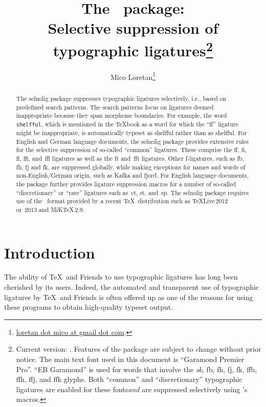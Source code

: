 \documentclass[11pt]{article}
\title{The \selnoligpackagename\ package: \\
Selective suppression of typographic ligatures\thanks{
Current version: \selnoligpackageversion. Features of the \pkg{selnolig} package are subject to change without prior notice. 
\newline\hspace*{\parindent}
The main text font used in this document is \enquote{Garamond Premier Pro}. \enquote{\ebg EB Garamond} is used for words that involve the \emph{\mbox{\ebg sk}}, {\ebg \mbox{fb}, \mbox{fh}, \mbox{fj}, \mbox{fk}, \mbox{ffb}, \mbox{ffh}, \mbox{ffj}, and \mbox{ffk}} glyphs. Both \enquote{common} and \enquote{discretionary} typographic ligatures are enabled for these fonts\textemdash \emph{and} are suppressed selectively using \pkg{selnolig}'s macros.}}
\author{Mico Loretan\thanks{
\href{mailto:loretan.mico@gmail.com}{loretan dot mico at gmail dot com}.}}
\date{\selnoligpackagedate}
\newcommand{\pkg}[1]{\textsf{#1}}
\newcommand{\opt}[1]{\texttt{#1}}
\begin{document}
\VerbatimFootnotes
{}
\maketitle


\begin{abstract}

The \pkg{selnolig} package suppresses typographic ligatures selectively, i.e., based on predefined search patterns. The search patterns focus on ligatures deemed inappropriate because they span morpheme boundaries. For example, the word \opt{shelfful}, which is mentioned in the \TeX book as a word for which the \enquote{ff} ligature might be inappropriate, is automatically typeset as shelfful rather than as shel\mbox{ff}ul.
\newline\hspace*{\parindent}
For English and German language documents, the \pkg{selnolig} package provides extensive rules for the selective suppression of so-called \enquote{common} ligatures. These comprise the ff, fi, fl, ffi, and~ffl ligatures as well as the ft and~fft ligatures. Other f-ligatures, such as {\ebg\mbox{fb}, \mbox{fh}, \mbox{fj}} and {\ebg\mbox{fk}}, are suppressed globally, while making exceptions for names and words of non-English/German origin, such as {\ebg Kafka} and {\ebg fjord}.
\newline\hspace*{\parindent}
For English language documents, the package further provides ligature suppression macros for a number of so-called \enquote{discretionary} or \enquote{rare} ligatures such as~ct, st, and~sp.
\newline\hspace*{\parindent}
The \pkg{selnolig} package requires use of the \LuaLaTeX\ format provided by a recent \TeX\ distribution such as \TeX Live\,2012 or~2013 and MiK\TeX\,2.9.
\end{abstract}

\tableofcontents

\clearpage
{}

\section{Introduction}

The ability of \TeX\ and Friends to use typographic ligatures has long been cherished by its users. Indeed, the automated and transparent use of typographic ligatures by \TeX\ and Friends is often offered up as one of the reasons for using these programs to obtain high-quality typeset output.
\end{document}
